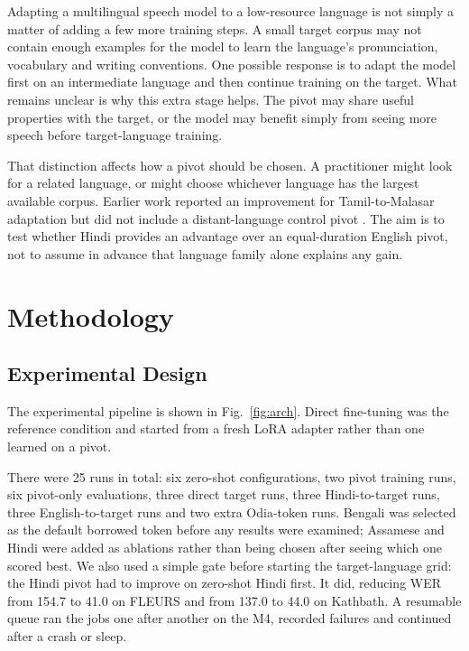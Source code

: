 \documentclass[conference]{IEEEtran}
\begin{document}
Adapting a multilingual speech model to a low-resource language is
not simply a matter of adding a few more training steps. A small target
corpus may not contain enough examples for the model to learn the
language's pronunciation, vocabulary and writing conventions. One
possible response is to adapt the model first on an intermediate
language and then continue training on the target. What remains unclear
is why this extra stage helps. The pivot may share useful properties
with the target, or the model may benefit simply from seeing more speech
before target-language training.

That distinction affects how a pivot should be chosen. A practitioner
might look for a related language, or might choose whichever language
has the largest available corpus. Earlier work reported an improvement
for Tamil-to-Malasar adaptation but did not include a distant-language
control pivot \cite{pillai2026multistage}. The aim is to test whether Hindi provides an advantage over an
equal-duration English pivot, not to assume in advance that language
family alone explains any gain.

\section{Methodology}

\subsection{Experimental Design}

The experimental pipeline is shown in Fig.~\ref{fig:arch}. Direct
fine-tuning was the reference condition and started from a fresh LoRA
adapter rather than one learned on a pivot.

There were 25 runs in total: six zero-shot configurations, two pivot
training runs, six pivot-only evaluations, three direct target runs,
three Hindi-to-target runs, three English-to-target runs and two extra
Odia-token runs. Bengali was selected as the default borrowed token
before any results were examined; Assamese and Hindi were added as
ablations rather than being chosen after seeing which one scored best.
We also used a simple gate before starting the target-language grid:
the Hindi pivot had to improve on zero-shot Hindi first. It did, reducing
WER from 154.7 to 41.0 on FLEURS and from 137.0 to 44.0 on Kathbath.
A resumable queue ran the jobs one after another on the M4, recorded
failures and continued after a crash or sleep.
\end{document}
